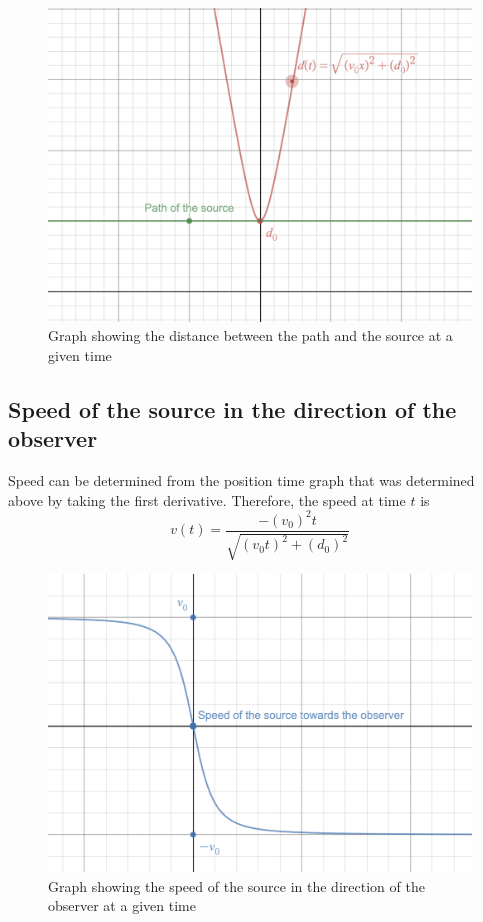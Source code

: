 \documentclass[12pt]{article}
\begin{document}
\begin{figure}[H]
	\centering
	\includegraphics[width=5in]{distance}
	\caption{Graph showing the distance between the path and the source at a given time}
	\label{fig:distance}
\end{figure}

\subsection{Speed of the source in the direction of the observer}

Speed can be determined from the position time graph that was determined above by taking the first derivative. Therefore, the speed at time $t$ is $$ v(t) = \frac{- (v_0)^2 t}{\sqrt{(v_0 t) ^ 2 + (d_0) ^ 2}} $$

\begin{figure}[H]
	\centering
	\includegraphics[width=5in]{velocity}
	\caption{Graph showing the speed of the source in the direction of the observer at a given time}
	\label{fig:velocity}
\end{figure}
\end{document}
